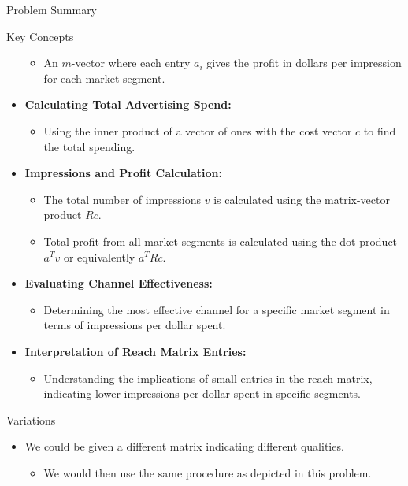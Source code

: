 \begin{summary}{Problem Summary}
\begin{statement}{Key Concepts}
\begin{itemize}
            \begin{itemize}
                \item An $m$-vector where each entry $a_{i}$ gives the profit in dollars per impression for each market segment.
            \end{itemize}
            \item \textbf{Calculating Total Advertising Spend:}
            \begin{itemize}
                \item Using the inner product of a vector of ones with the cost vector $c$ to find the total spending.
            \end{itemize}
            \item \textbf{Impressions and Profit Calculation:}
            \begin{itemize}
                \item The total number of impressions $v$ is calculated using the matrix-vector product $Rc$.
                \item Total profit from all market segments is calculated using the dot product $a^{T}v$ or equivalently $a^{T}Rc$.
            \end{itemize}
            \item \textbf{Evaluating Channel Effectiveness:}
            \begin{itemize}
                \item Determining the most effective channel for a specific market segment in terms of impressions per dollar spent.
            \end{itemize}
            \item \textbf{Interpretation of Reach Matrix Entries:}
            \begin{itemize}
                \item Understanding the implications of small entries in the reach matrix, indicating lower impressions per dollar spent in specific segments.
            \end{itemize}
        \end{itemize}
    \end{statement}
    \begin{statement}{Variations}
        \begin{itemize}
            \item We could be given a different matrix indicating different qualities.
            \begin{itemize}
                \item We would then use the same procedure as depicted in this problem. 
            \end{itemize}
        \end{itemize}
    \end{statement}
\end{summary}

